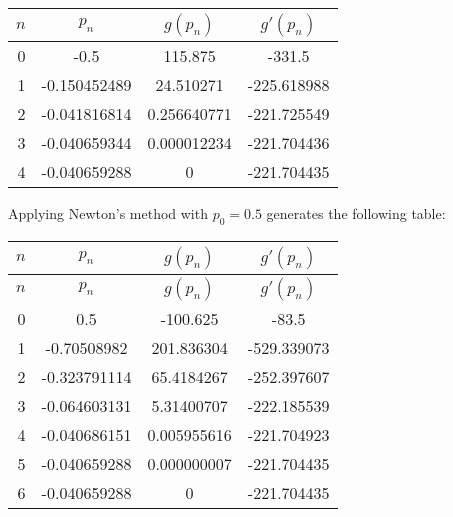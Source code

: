 \documentclass[../../../../Assignments]{subfiles}
\begin{document}
\begin{solution}
\begin{enumerate}[label = \alph*)]
            \begin{table}[H]
                \centering
                \begin{tabular}{r S[table-format=-1.9] S[table-format=3.9] S[table-format=-3.6]}
                    \toprule
                    \(n\)  &    {\(p_n\)}   &   {\(g(p_n)\)}  &  {\(g'(p_n)\)}  \\
                      &  -0.5          &  115.875        &  -331.5         \\
                        1  &  -0.150452489  &   24.510271     &  -225.618988    \\
                        2  &  -0.041816814  &    0.256640771  &  -221.725549    \\
                        3  &  -0.040659344  &    0.000012234  &  -221.704436    \\
                        4  &  -0.040659288  &    0            &  -221.704435    \\
                    \bottomrule
                \end{tabular}
            \end{table}

            Applying Newton's method with \(p_0 = \num{0.5}\) generates the
            following table:

            \begin{longtable}{r S[table-format=-1.9] S[table-format=-3.9] S[table-format=-3.6]}
                \toprule
                \(n\)  &    {\(p_n\)}   &   {\(g(p_n)\)}   &  {\(g'(p_n)\)}  \\
                \midrule
                \endfirsthead
                \(n\)  &    {\(p_n\)}   &   {\(g(p_n)\)}   &  {\(g'(p_n)\)}  \\
                \midrule
                  &   0.5          &  -100.625        &   -83.5         \\
                    1  &  -0.70508982   &   201.836304     &  -529.339073    \\
                    2  &  -0.323791114  &    65.4184267    &  -252.397607    \\
                    3  &  -0.064603131  &     5.31400707   &  -222.185539    \\
                    4  &  -0.040686151  &     0.005955616  &  -221.704923    \\
                    5  &  -0.040659288  &     0.000000007  &  -221.704435    \\
                    6  &  -0.040659288  &     0            &  -221.704435    \\
                \bottomrule
            \end{longtable}
    \end{enumerate}
\end{solution}
\end{document}
